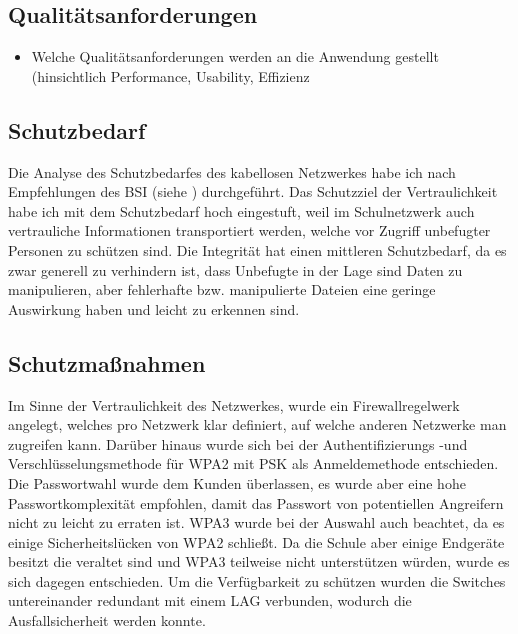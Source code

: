 \subsection{Qualitätsanforderungen}
\label{sec:Qualitaetsanforderungen}
\begin{itemize}
	\item Welche Qualitätsanforderungen werden an die Anwendung gestellt (\zB hinsichtlich Performance, Usability, Effizienz \etc 
\end{itemize}

\subsection{Schutzbedarf}
\label{sec:Schutzbedarf}
Die Analyse des Schutzbedarfes des kabellosen Netzwerkes habe ich nach Empfehlungen des \ac{BSI} (siehe ) durchgeführt. Das Schutzziel der Vertraulichkeit habe ich mit dem Schutzbedarf hoch eingestuft, weil im Schulnetzwerk auch vertrauliche Informationen transportiert werden, welche vor Zugriff unbefugter Personen zu schützen sind. Die Integrität hat einen mittleren Schutzbedarf, da es zwar generell zu verhindern ist, dass Unbefugte in der Lage sind Daten zu manipulieren, aber fehlerhafte bzw. manipulierte Dateien eine geringe Auswirkung haben und leicht zu erkennen sind.


\begin{comment}
	\item Welcher Schutzbedarf  wird an die Anwendung gestellt (\zB hinsichtlich Sicherheit, Wichtigtkeit, ... \etc (siehe \citet{BSI-S-200-2}))?
\end{comment}

\subsection{Schutzmaßnahmen}
\label{sec:Schutzmaßnahmen}
Im Sinne der Vertraulichkeit des Netzwerkes, wurde ein Firewallregelwerk angelegt, welches pro Netzwerk klar definiert, auf welche anderen Netzwerke man zugreifen kann. Darüber hinaus wurde sich bei der Authentifizierungs -und Verschlüsselungsmethode für WPA2 mit \ac{PSK} als Anmeldemethode entschieden. Die Passwortwahl wurde dem Kunden überlassen, es wurde aber eine hohe Passwortkomplexität empfohlen, damit das Passwort von potentiellen Angreifern nicht zu leicht zu erraten ist. WPA3 wurde bei der Auswahl auch beachtet, da es einige Sicherheitslücken von WPA2  schließt. Da die Schule aber einige Endgeräte besitzt die veraltet sind und WPA3 teilweise nicht unterstützen würden, wurde es sich dagegen entschieden. Um die Verfügbarkeit zu schützen wurden die Switches untereinander redundant mit einem \ac{LAG} verbunden, wodurch die Ausfallsicherheit werden konnte.  
\begin{comment}
	\item Welche Schutznahmen werden unternommen um das System abzichern (\zB gegenüber fremden Zugriff, Sicherheitslücken, Updates, Ausfall des Systems \etc)?
\end{comment}
